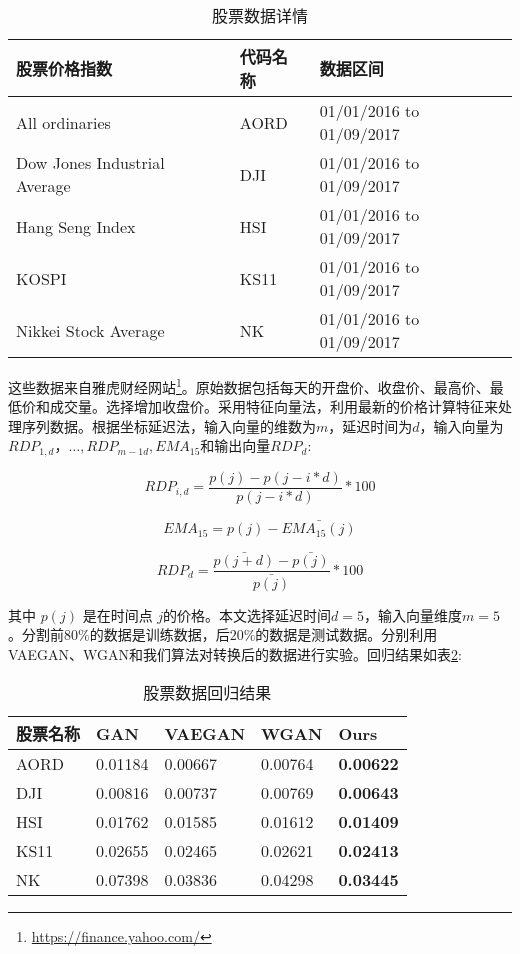 \begin{table}[hpb]
	\centering
	\caption{股票数据详情}
	\label{tab1}
	\begin{tabular}{lll} \toprule
		股票价格指数   & 代码名称 &  数据区间  \\  \midrule
		All ordinaries   & AORD&  01/01/2016 to 01/09/2017 \\
		Dow Jones Industrial Average   & DJI&01/01/2016 to 01/09/2017\\
		Hang Seng Index   & HSI&   01/01/2016 to 01/09/2017\\
		KOSPI   & KS11& 01/01/2016 to 01/09/2017\\
		Nikkei Stock Average   &NK&   01/01/2016 to 01/09/2017\\
		\bottomrule
	\end{tabular}
\end{table}

这些数据来自雅虎财经网站\footnote{\url{https://finance.yahoo.com/}}。原始数据包括每天的开盘价、收盘价、最高价、最低价和成交量。选择增加收盘价。采用特征向量法\cite{18}，利用最新的价格计算特征来处理序列数据。根据坐标延迟法，输入向量的维数为$m$，延迟时间为$d$，输入向量为$RDP_{1,d}，…,RDP_ {m - 1 d}, EMA_{15}$和输出向量$RDP_ {d} $:

\begin{equation}
\label{eq16}
RDP_{i,d} = \frac{p(j)-p(j-i*d)}{p(j-i*d)}*100
\end{equation}


\begin{equation}
\label{eq17}
EMA_{15}  = p(j)-\bar{EMA_{15}(j)}
\end{equation}

\begin{equation}
\label{eq18}
RDP_{d} = \frac{\bar{p(j+d)}-\bar{p(j)}}{\bar{p(j)}}*100
\end{equation}


其中 $p(j)$ 是在时间点 $j$的价格。本文选择延迟时间$d=5$，输入向量维度$m=5$。分割前$80\% $的数据是训练数据，后$20\% $的数据是测试数据。分别利用VAEGAN、WGAN和我们算法对转换后的数据进行实验。回归结果如表\ref{tab2}:

\begin{table}[hpb]
	\centering
	\caption{股票数据回归结果}
	\label{tab2}
	\begin{tabular}{lllll} \toprule
		股票名称 & GAN &  VAEGAN & WGAN &Ours  \\ 
		\midrule
		AORD&0.01184 & 0.00667 & 0.00764 &\textbf{0.00622}   \\
		DJI &0.00816&0.00737&0.00769&\textbf{0.00643}  \\
		HSI&0.01762&0.01585&0.01612&\textbf{0.01409}  \\
		KS11&0.02655&0.02465&0.02621&\textbf{0.02413}\\
		NK & 0.07398& 0.03836& 0.04298&\textbf{0.03445} \\
		\bottomrule
	\end{tabular}
\end{table}

